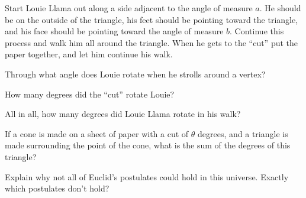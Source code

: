 \documentclass{ximera}
\begin{document}
Start Louie Llama out along a side adjacent to the angle of measure
$a$. He should be on the outside of the triangle, his feet should be
pointing toward the triangle, and his face should be pointing toward
the angle of measure $b$. Continue this process and walk him all
around the triangle. When he gets to the ``cut'' put the paper
together, and let him continue his walk.

\begin{question} 
Through what angle does Louie rotate when he strolls around a vertex?
\end{question}

\begin{question}
How many degrees did the ``cut'' rotate Louie? 
\end{question}

\begin{question} 
All in all, how many degrees did Louie Llama rotate in his walk?
\end{question}


\begin{question}
If a cone is made on a sheet of paper with a cut of $\theta$ degrees,
and a triangle is made surrounding the point of the cone, what is the
sum of the degrees of this triangle?
\end{question}




\begin{question}
Explain why not all of Euclid's postulates could hold in this
universe. Exactly which postulates don't hold?
\end{question}
\end{document}
